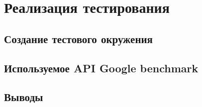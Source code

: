 \chapter{Реализация тестирования}
\section{Создание тестового окружения}
\section{Используемое API Google benchmark}
\section{Выводы}